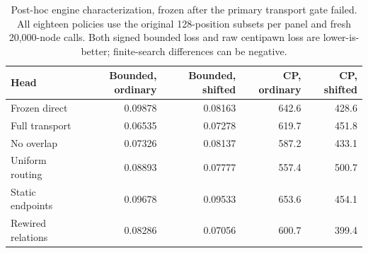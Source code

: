 \begin{table}[t]
\centering\small
\caption{Post-hoc engine characterization, frozen after the primary transport gate failed. All eighteen policies use the original 128-position subsets per panel and fresh 20,000-node calls. Both signed bounded loss and raw centipawn loss are lower-is-better; finite-search differences can be negative.}
\begin{tabular}{lrrrr}
\toprule
Head & Bounded, ordinary & Bounded, shifted & CP, ordinary & CP, shifted \\
\midrule
Frozen direct & 0.09878 & 0.08163 & 642.6 & 428.6 \\
Full transport & 0.06535 & 0.07278 & 619.7 & 451.8 \\
No overlap & 0.07326 & 0.08137 & 587.2 & 433.1 \\
Uniform routing & 0.08893 & 0.07777 & 557.4 & 500.7 \\
Static endpoints & 0.09678 & 0.09533 & 653.6 & 454.1 \\
Rewired relations & 0.08286 & 0.07056 & 600.7 & 399.4 \\
\bottomrule
\end{tabular}
\end{table}
